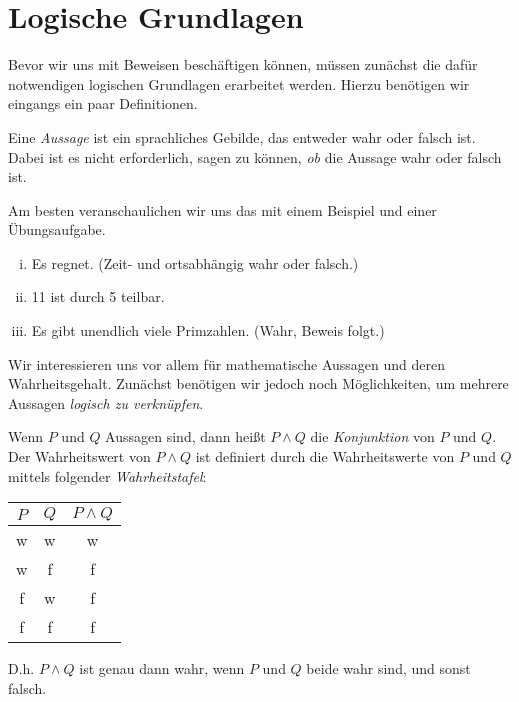 \chapter{Logische Grundlagen}

Bevor wir uns mit Beweisen beschäftigen können, müssen zunächst die dafür
notwendigen logischen Grundlagen erarbeitet werden.
Hierzu benötigen wir eingangs ein paar Definitionen.

\begin{mydef}
Eine \textit{Aussage} ist ein sprachliches Gebilde, das entweder wahr oder
falsch ist.
Dabei ist es nicht erforderlich, sagen zu können, \textit{ob} die Aussage wahr
oder falsch ist.
\end{mydef}

Am besten veranschaulichen wir uns das mit einem Beispiel und einer Übungsaufgabe.

\begin{example}
    \begin{enumerate}[(i)]
        \item
        Es regnet. (Zeit- und ortsabhängig wahr oder falsch.)
        \item
        11 ist durch 5 teilbar.
        \item
        Es gibt unendlich viele Primzahlen. (Wahr, Beweis folgt.)
    \end{enumerate}
\end{example}

Wir interessieren uns vor allem für mathematische Aussagen und deren
Wahrheitsgehalt.
Zunächst benötigen wir jedoch noch Möglichkeiten, um mehrere Aussagen
\textit{logisch zu verknüpfen}.

\begin{mydef}
Wenn $P$ und $Q$ Aussagen sind, dann heißt $P \wedge Q$ die \textit{Konjunktion}
von $P$ und $Q$.
Der Wahrheitswert von $P \wedge Q$ ist definiert durch die Wahrheitswerte von
$P$ und $Q$ mittels folgender \textit{Wahrheitstafel}:

\begin{tabular}{ c | c | c }
        $P$ & $Q$ & $P \wedge Q$ \\
        \hline
        w & w & w \\
        w & f & f \\
        f & w & f \\
        f & f & f \\
    \end{tabular}
    \newline
D.h. $P \wedge Q$ ist genau dann wahr, wenn $P$ und $Q$ beide wahr sind,
und sonst falsch.
\end{mydef}

